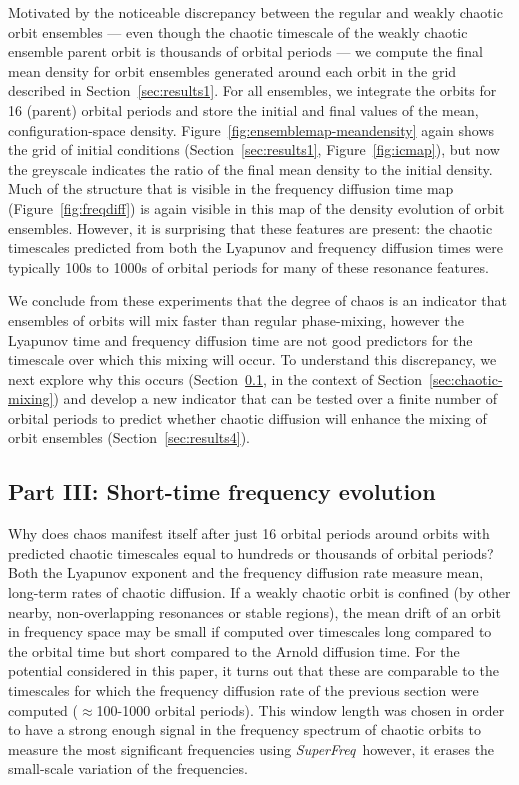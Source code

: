 \documentclass[letterpaper,12pt,preprint]{aastex}
\newcommand{\project}[1]{\textsl{#1}}
\newcommand{\superfreq}{\project{SuperFreq}}
\begin{document}
Motivated by the noticeable discrepancy between the regular and weakly chaotic orbit ensembles --- even though the chaotic timescale of the weakly chaotic ensemble parent orbit is thousands of orbital periods --- we compute the final mean density for orbit ensembles generated around each orbit in the grid described in Section~\ref{sec:results1}. For all ensembles, we integrate the orbits for 16 (parent) orbital periods and store the initial and final values of the mean, configuration-space density. Figure~\ref{fig:ensemblemap-meandensity} again shows the grid of initial conditions (Section~\ref{sec:results1}, Figure~\ref{fig:icmap}), but now the greyscale indicates the ratio of the final mean density to the initial density. Much of the structure that is visible in the frequency diffusion time map (Figure~\ref{fig:freqdiff}) is again visible in this map of the density evolution of orbit ensembles. However, it is surprising that these features are present: the chaotic timescales predicted from both the Lyapunov and frequency diffusion times were typically 100s to 1000s of orbital periods for many of these resonance features.

We conclude from these experiments that the degree of chaos is an indicator that ensembles of orbits will mix faster than regular phase-mixing, however the Lyapunov time and frequency diffusion time are not good predictors for the timescale over which this mixing will occur. To understand this discrepancy, we next explore why this occurs (Section~\ref{sec:results3}, in the context of Section~\ref{sec:chaotic-mixing}) and develop a new indicator that can be tested over a finite number of orbital periods to predict whether chaotic diffusion will enhance the mixing of orbit ensembles (Section~\ref{sec:results4}).

\subsection{Part III: Short-time frequency evolution}\label{sec:results3}

Why does chaos manifest itself after just 16 orbital periods around orbits with predicted chaotic timescales equal to hundreds or thousands of orbital periods? Both the Lyapunov exponent and the frequency diffusion rate measure mean, long-term rates of chaotic diffusion. If a weakly chaotic orbit is confined (by other nearby, non-overlapping resonances or stable regions), the mean drift of an orbit in frequency space may be small if computed over timescales long compared to the orbital time but short compared to the Arnold diffusion time. For the potential considered in this paper, it turns out that these are comparable to the timescales for which the frequency diffusion rate of the previous section were computed ($\approx$100-1000 orbital periods). This window length was chosen in order to have a strong enough signal in the frequency spectrum of chaotic orbits to measure the most significant frequencies using \superfreq\, however, it erases the small-scale variation of the frequencies. 
\end{document}
